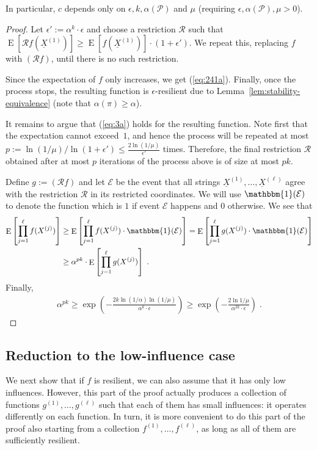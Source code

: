 \documentclass{daj}
\newcommand{\1}{\mathbbm{1}}
\theoremstyle{plain}
\theoremstyle{definition}
\DeclareMathOperator*{\EE}{E}
\newcommand{\cE}{\mathcal{E}}
\newcommand{\cR}{\mathcal{R}}
\begin{document}
In particular, $c$ depends only on $\epsilon, k, \alpha(\mathcal{P})$ and $\mu$
(requiring $\epsilon, \alpha(\mathcal{P}), \mu > 0$).

\begin{proof}
Let $\epsilon' := \alpha^k\cdot\epsilon$ and
choose a restriction $\cR$ such that 
$\EE[\cR f(\underline{X}^{(1)})] \geq \EE[f(\underline{X}^{(1)})] 
\cdot (1+\epsilon')$.
We repeat this, replacing $f$ with $(\cR f)$, until there is no such 
restriction.

Since the expectation of $f$ only increases, we get (\ref{eq:241a}).
Finally, once the process stops, the resulting function is $\epsilon$-resilient
due to Lemma~\ref{lem:stability-equivalence} 
(note that $\alpha(\pi) \ge \alpha$).

It remains to argue that (\ref{eq:3a}) holds for the resulting function.
Note first that the expectation cannot exceed~$1$, and
hence the process will be repeated at 
most $p := \ln(1/\mu)/\ln(1+\epsilon') \le \frac{2\ln(1/\mu)}{\epsilon'}$ times.
Therefore, the final restriction $\cR$ obtained after at most $p$ iterations
of the process above is of size at most $pk$.

Define $g := (\cR f)$ and
let $\mathcal{E}$ be the event that all 
strings $\underline{X}^{(1)},\ldots,\underline{X}^{(\ell)}$
agree with the restriction $\cR$ in its restricted coordinates.
We will use $\1(\cE)$ to denote the function which is 
$1$ if event $\cE$ happens and $0$ otherwise.
We see that
\begin{align*}
\EE \left[ \prod_{j=1}^{\ell} f(X^{(j)}) \right] &\ge 
\EE\left[ \prod_{j=1}^{\ell} f(X^{(j)}) \cdot \1(\mathcal{E}) \right]
=
\EE\left[ \prod_{j=1}^{\ell} g(X^{(j)}) \cdot \1(\mathcal{E}) \right]\\
&\geq 
\alpha^{pk} 
\cdot \EE \left[ \prod_{j=1}^{\ell} g(X^{(j)}) \right] \; .
\end{align*}
Finally,
\begin{align*}
\alpha^{pk} \ge 
\exp\left(-\frac{2 k \ln (1/\alpha) \ln (1/\mu)}{\alpha^k \cdot \epsilon}\right)
\ge \exp \left( - \frac{2 \ln 1/\mu}{\alpha^{2k} \cdot \epsilon}  \right) 
\; .
\end{align*}
\end{proof}

\subsection{Reduction to the low-influence case}
We next show that if $f$ is resilient, we can also assume that it has
only low influences.
However, this part of the proof actually produces a collection of functions 
$g^{(1)},\ldots, g^{(\ell)}$ such that each of them
has small influences: it operates differently on each function.
In turn, it is more convenient to do this part of the proof also starting 
from a collection $f^{(1)},\ldots,f^{(\ell)}$, as long as all of
them are sufficiently resilient.
\end{document}
